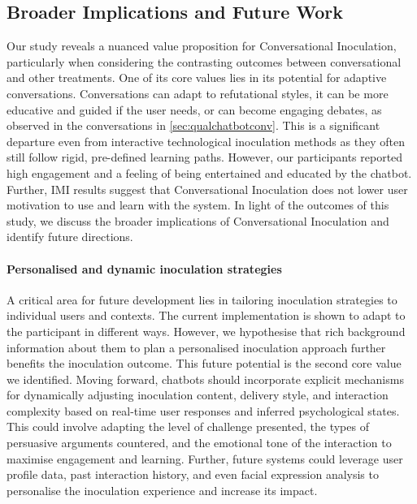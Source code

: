 \documentclass[sigconf]{acmart}
\begin{document}
\subsection{Broader Implications and Future Work}

Our study reveals a nuanced value proposition for Conversational Inoculation, particularly when considering the contrasting outcomes between conversational and other treatments.
One of its core values lies in its potential for adaptive conversations. Conversations can adapt to refutational styles, it can be more educative and guided if the user needs, or can become engaging debates, as observed in the conversations in \autoref{sec:qualchatbotconv}.
This is a significant departure even from interactive technological inoculation methods \cite{Jeon_Kim_Xiong_Lee_Han_2021, Basol_Roozenbeek_VanDerLinden_2020} as they often still follow rigid, pre-defined learning paths. However, our participants reported high engagement and a feeling of being entertained and educated by the chatbot. 
Further, IMI results suggest that Conversational Inoculation does not lower user motivation to use and learn with the system.
In light of the outcomes of this study, we discuss the broader implications of Conversational Inoculation and identify future directions.

\paragraph{Personalised and dynamic inoculation strategies}

A critical area for future development lies in tailoring inoculation strategies to individual users and contexts. 
The current implementation is shown to adapt to the participant in different ways. However, we hypothesise that rich background information about them to plan a personalised inoculation approach further benefits the inoculation outcome. 
This future potential is the second core value we identified.
Moving forward, chatbots should incorporate explicit mechanisms for dynamically adjusting inoculation content, delivery style, and interaction complexity based on real-time user responses and inferred psychological states. 
This could involve adapting the level of challenge presented, the types of persuasive arguments countered, and the emotional tone of the interaction to maximise engagement and learning. 
Further, future systems could leverage user profile data, past interaction history, and even facial expression analysis to personalise the inoculation experience and increase its impact.
\end{document}
